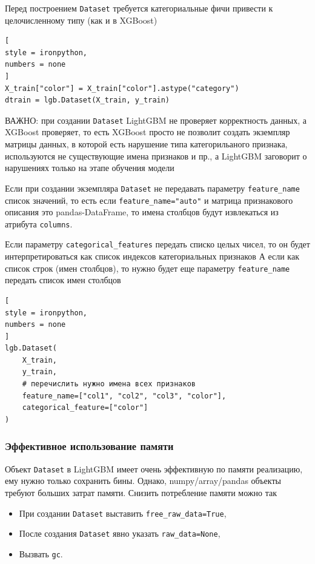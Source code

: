 \documentclass[%
	11pt,
	a4paper,
	utf8,
		]{article}
\begin{document}
Перед построением \verb|Dataset| требуется категориальные фичи привести к целочисленному типу (как и в XGBoost)
\begin{lstlisting}[
style = ironpython,
numbers = none
]
X_train["color"] = X_train["color"].astype("category")
dtrain = lgb.Dataset(X_train, y_train)
\end{lstlisting}

{\color{red}ВАЖНО: при создании \verb|Dataset| LightGBM не проверяет корректность данных, а XGBoost проверяет, то есть XGBoost просто не позволит создать экземпляр матрицы данных, в которой есть нарушение типа категорильаного признака, используются не существующие имена признаков и пр., а LightGBM заговорит о нарушениях только на этапе обучения модели}

Если при создании экземпляра \verb|Dataset| не передавать параметру \verb|feature_name| список значений, то есть если \verb|feature_name="auto"| и матрица признакового описания это pandas-DataFrame, то имена столбцов будут извлекаться из атрибута \verb|columns|. 

Если параметру \verb|categorical_features| передать списко целых чисел, то он будет интерпретироваться как список индексов категориальных признаков А если как список строк (имен столбцов), то нужно будет еще параметру \verb|feature_name| передать список имен столбцов
\begin{lstlisting}[
style = ironpython,
numbers = none
]
lgb.Dataset(
    X_train,
    y_train,
    # перечислить нужно имена всех признаков
    feature_name=["col1", "col2", "col3", "color"],
    categorical_feature=["color"]
)
\end{lstlisting}

\subsubsection{Эффективное использование памяти}

Объект \verb|Dataset| в LightGBM имеет очень эффективную по памяти реализацию, ему нужно только сохранить бины. Однако, numpy/array/pandas объекты требуют больших затрат памяти. Снизить потребление памяти можно так
\begin{itemize}
	\item При создании \verb|Dataset| выставить \verb|free_raw_data=True|,
	
	\item После создания \verb|Dataset| явно указать \verb|raw_data=None|,
	
	\item Вызвать \verb|gc|.
\end{itemize}
\end{document}

